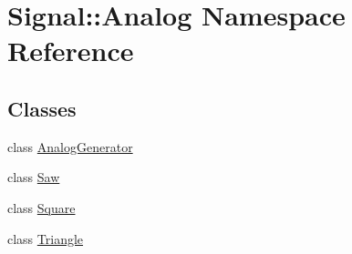 \hypertarget{namespaceSignal_1_1Analog}{\section{Signal\+:\+:Analog Namespace Reference}
\label{namespaceSignal_1_1Analog}
}
\subsection*{Classes}
\begin{DoxyCompactItemize}
\item 
class \hyperlink{classSignal_1_1Analog_1_1AnalogGenerator}{Analog\+Generator}
\item 
class \hyperlink{classSignal_1_1Analog_1_1Saw}{Saw}
\item 
class \hyperlink{classSignal_1_1Analog_1_1Square}{Square}
\item 
class \hyperlink{classSignal_1_1Analog_1_1Triangle}{Triangle}
\end{DoxyCompactItemize}
